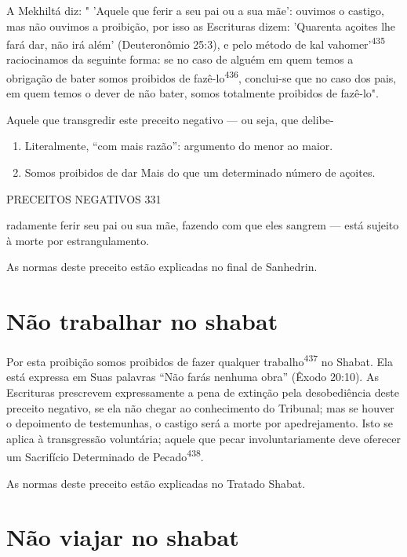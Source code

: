 A Mekhiltá diz: " 'Aquele que ferir a seu pai ou a sua mãe': ouvimos o
castigo, mas não ouvimos a proibição, por isso as Escrituras dizem:
'Quaren­ta açoites lhe fará dar, não irá além' (Deuteronômio 25:3), e
pelo método de kal vahomer'\textsuperscript{435} raciocinamos da
seguinte forma: se no caso de alguém em quem temos a obrigação de bater
somos proibidos de fazê-lo\textsuperscript{436}, conclui-se que no caso
dos pais, em quem temos o dever de não bater, somos totalmente
proi­bidos de fazê-lo".


Aquele que transgredir este preceito negativo --- ou seja, que delibe-

\begin{enumerate}
\def\labelenumi{\arabic{enumi}.}
\setcounter{enumi}{434}
\item
 
 Literalmente, ``com mais razão'': argumento do menor ao maior.
 
\item
 
 Somos proibidos de dar Mais do que um determinado número de açoites.
 
\end{enumerate}


PRECEITOS NEGATIVOS 331

radamente ferir seu pai ou sua mãe, fazendo com que eles sangrem ---
está su­jeito à morte por estrangulamento.


As normas deste preceito estão explicadas no final de Sanhedrin.


\section{Não trabalhar no shabat}

Por esta proibição somos proibidos de fazer qualquer
trabalho\textsuperscript{437} no Shabat. Ela está expressa em Suas
palavras ``Não farás nenhuma obra'' (Êxodo 20:10). As Escrituras
prescrevem expressamente a pena de extinção pela deso­bediência deste
preceito negativo, se ela não chegar ao conhecimento do Tri­bunal; mas
se houver o depoimento de testemunhas, o castigo será a morte por
apedrejamento. Isto se aplica à transgressão voluntária; aquele que
pecar invo­luntariamente deve oferecer um Sacrifício Determinado de
Pecado\textsuperscript{438}.

As normas deste preceito estão explicadas no Tratado Shabat.

\section{Não viajar no shabat}

